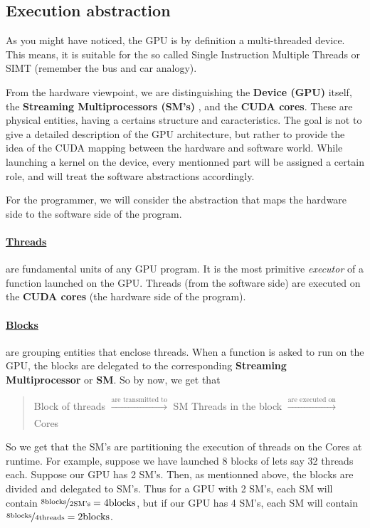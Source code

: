 \documentclass[12pt]{article}
\begin{document}
\subsection{Execution abstraction}
As you might have noticed, the GPU is by definition a multi-threaded device. This means, it is suitable for the so called 
Single Instruction Multiple Threads or SIMT (remember the bus and car analogy).


From the hardware viewpoint, we are distinguishing the \textbf{Device (GPU)} itself, the \textbf{Streaming Multiprocessors (SM's)}
, and the \textbf{CUDA cores}. These are physical entities, having a certains structure and caracteristics. 
The goal is not to give a detailed description of the GPU architecture, but rather to provide the 
idea of the CUDA mapping between the hardware and software world. While launching a kernel on the device, 
every mentionned part will be assigned a certain role, and will treat the software abstractions accordingly.

For the programmer, we will consider the abstraction that maps the hardware side to the software side of the program. 

\vspace{-15pt}
\paragraph{\underline{Threads}} are fundamental units of any GPU program. It is the most primitive \textit{executor} of a function 
launched on the GPU. Threads (from the software side) are executed on the \textbf{CUDA cores} (the hardware side of the program).

\vspace{-15pt}
\paragraph{\underline{Blocks}} \label{blocks} are grouping entities that enclose threads. When a function is asked to run on the GPU, the 
blocks are delegated to the corresponding \textbf{Streaming Multiprocessor} or \textbf{SM}.
So by now, we get that 

\begin{quote}
   \centering
   Block of threads $\xrightarrow[]{\text{are transmitted to}}$ SM \newline
   Threads in the block $\xrightarrow[]{\text{are executed on}}$ Cores 
\end{quote} 

So we get that the SM's are partitioning the execution of threads on the Cores at runtime. For example, suppose we have 
launched 8 blocks of lets say 32 threads each. Suppose our GPU has 2 SM's. Then, as mentionned above, 
the blocks are divided and delegated to SM's. Thus for a GPU with 2 SM's, each SM will contain 
$\nicefrac{8\text{blocks}}{2\text{SM's}} = 4 \text{blocks}$, but if our GPU has 4 SM's, 
each SM will contain $\nicefrac{8\text{blocks}}{4\text{threads}} = 2 \text{blocks}$.
\end{document}

